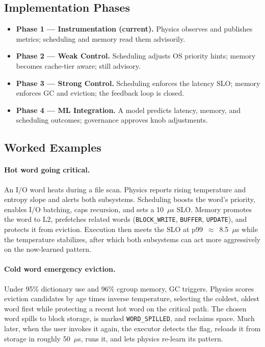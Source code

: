 \subsection{Implementation Phases}

\begin{itemize}
  \item \textbf{Phase 1 --- Instrumentation (current).} Physics observes and
        publishes metrics; scheduling and memory read them advisorily.
  \item \textbf{Phase 2 --- Weak Control.} Scheduling adjusts OS priority hints;
        memory becomes cache-tier aware; still advisory.
  \item \textbf{Phase 3 --- Strong Control.} Scheduling enforces the latency SLO;
        memory enforces GC and eviction; the feedback loop is closed.
  \item \textbf{Phase 4 --- ML Integration.} A model predicts latency, memory, and
        scheduling outcomes; governance approves knob adjustments.
\end{itemize}

\subsection{Worked Examples}

\paragraph{Hot word going critical.} An I/O word heats during a file scan. Physics
reports rising temperature and entropy slope and alerts both subsystems. Scheduling
boosts the word's priority, enables I/O batching, caps recursion, and sets a 10~$\mu$s
SLO. Memory promotes the word to L2, prefetches related words
(\texttt{BLOCK\_WRITE}, \texttt{BUFFER}, \texttt{UPDATE}), and protects it from
eviction. Execution then meets the SLO at p99~$\approx$~8.5~$\mu$s while the
temperature stabilizes, after which both subsystems can act more aggressively on the
now-learned pattern.

\paragraph{Cold word emergency eviction.} Under 95\% dictionary use and 96\% cgroup
memory, GC triggers. Physics scores eviction candidates by age times inverse
temperature, selecting the coldest, oldest word first while protecting a recent hot
word on the critical path. The chosen word spills to block storage, is marked
\texttt{WORD\_SPILLED}, and reclaims space. Much later, when the user invokes it
again, the executor detects the flag, reloads it from storage in roughly 50~$\mu$s,
runs it, and lets physics re-learn its pattern.

